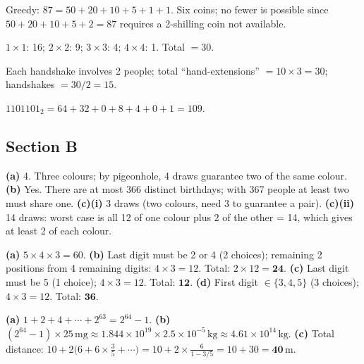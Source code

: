 \begin{solution}[4. (C) 6 coins]
Greedy: $87 = 50 + 20 + 10 + 5 + 1 + 1$.
Six coins; no fewer is possible since $50 + 20 + 10 + 5 + 2 = 87$ requires a 2-shilling coin not available.
\end{solution}

\begin{solution}[5. (C) 30]
$1\times1$: 16; $2\times2$: 9; $3\times3$: 4; $4\times4$: 1. Total $= 30$.
\end{solution}

\begin{solution}[6. (C) 15]
Each handshake involves 2 people; total ``hand-extensions'' $= 10 \times 3 = 30$; handshakes $= 30/2 = 15$.
\end{solution}

\begin{solution}[7. (D) 109]
$1101101_2 = 64+32+0+8+4+0+1 = 109$.
\end{solution}

\subsection*{Section B}

\begin{solution}[8. Pigeonhole]
\textbf{(a)} 4. Three colours; by pigeonhole, 4 draws guarantee two of the same colour.
\textbf{(b)} Yes. There are at most 366 distinct birthdays; with 367 people at least two must share one.
\textbf{(c)(i)} 3 draws (two colours, need 3 to guarantee a pair).
\textbf{(c)(ii)} 14 draws: worst case is all 12 of one colour plus 2 of the other = 14, which gives at least 2 of each colour.
\end{solution}

\begin{solution}[9. Combinatorics]
\textbf{(a)} $5 \times 4 \times 3 = 60$.
\textbf{(b)} Last digit must be 2 or 4 (2 choices); remaining 2 positions from 4 remaining digits: $4 \times 3 = 12$. Total: $2 \times 12 = \mathbf{24}$.
\textbf{(c)} Last digit must be 5 (1 choice); $4 \times 3 = 12$. Total: $\mathbf{12}$.
\textbf{(d)} First digit $\in \{3,4,5\}$ (3 choices); $4 \times 3 = 12$. Total: $\mathbf{36}$.
\end{solution}

\begin{solution}
\textbf{(a)} $1 + 2 + 4 + \cdots + 2^{63} = 2^{64} - 1$.
\textbf{(b)} $(2^{64}-1) \times 25\,\text{mg} \approx 1.844\times10^{19} \times 2.5\times10^{-5}\,\text{kg} \approx 4.61 \times 10^{14}\,\text{kg}$.
\textbf{(c)} Total distance: $10 + 2\bigl(6 + 6\times\tfrac{3}{5} + \cdots\bigr) = 10 + 2\times\tfrac{6}{1-3/5} = 10 + 30 = \mathbf{40}\,\text{m}$.
\end{solution}

